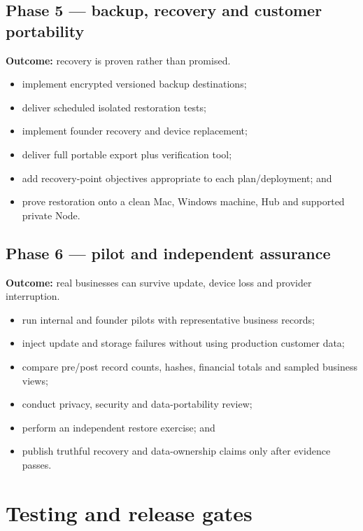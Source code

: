 \documentclass[11pt]{article}
\begin{document}
\subsection{Phase 5 --- backup, recovery and customer portability}

\textbf{Outcome:} recovery is proven rather than promised.

\begin{itemize}
  \item implement encrypted versioned backup destinations;
  \item deliver scheduled isolated restoration tests;
  \item implement founder recovery and device replacement;
  \item deliver full portable export plus verification tool;
  \item add recovery-point objectives appropriate to each plan/deployment; and
  \item prove restoration onto a clean Mac, Windows machine, Hub and supported private Node.
\end{itemize}

\subsection{Phase 6 --- pilot and independent assurance}

\textbf{Outcome:} real businesses can survive update, device loss and provider interruption.

\begin{itemize}
  \item run internal and founder pilots with representative business records;
  \item inject update and storage failures without using production customer data;
  \item compare pre/post record counts, hashes, financial totals and sampled business views;
  \item conduct privacy, security and data-portability review;
  \item perform an independent restore exercise; and
  \item publish truthful recovery and data-ownership claims only after evidence passes.
\end{itemize}

\section{Testing and release gates}
\end{document}
